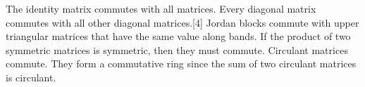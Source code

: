 The identity matrix commutes with all matrices.
Every diagonal matrix commutes with all other diagonal matrices.[4]
Jordan blocks commute with upper triangular matrices that have the same value along bands.
If the product of two symmetric matrices is symmetric, then they must commute.
Circulant matrices commute. They form a commutative ring since the sum of two circulant matrices is circulant.